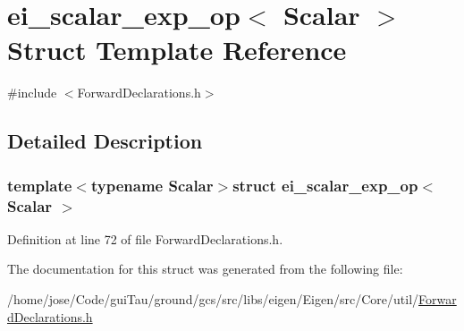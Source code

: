 \hypertarget{structei__scalar__exp__op}{\section{ei\-\_\-scalar\-\_\-exp\-\_\-op$<$ Scalar $>$ Struct Template Reference}
\label{structei__scalar__exp__op}
}


{\ttfamily \#include $<$Forward\-Declarations.\-h$>$}



\subsection{Detailed Description}
\subsubsection*{template$<$typename Scalar$>$struct ei\-\_\-scalar\-\_\-exp\-\_\-op$<$ Scalar $>$}



Definition at line 72 of file Forward\-Declarations.\-h.



The documentation for this struct was generated from the following file\-:\begin{DoxyCompactItemize}
\item 
/home/jose/\-Code/gui\-Tau/ground/gcs/src/libs/eigen/\-Eigen/src/\-Core/util/\hyperlink{_forward_declarations_8h}{Forward\-Declarations.\-h}\end{DoxyCompactItemize}

